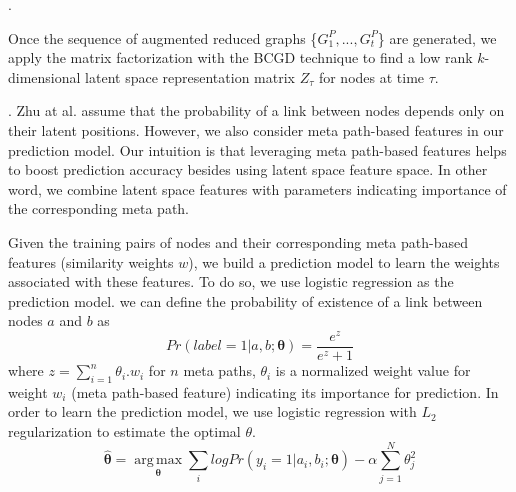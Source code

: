 .

Once the sequence of augmented reduced graphs \{$G^P_1, ..., G^P_t$\} are generated, we apply the matrix factorization with the BCGD technique \cite{Zhu2016} to find a low rank $k$-dimensional latent space representation matrix $Z_\tau$ for nodes at time $\tau$.






. Zhu at al. \cite{Zhu2016} assume that the probability of a link between nodes depends only on their latent positions. However, we also consider meta path-based features in our prediction model. Our intuition is that leveraging meta path-based features helps to boost prediction accuracy besides using latent space feature space. In other word, we combine latent space features with parameters indicating importance of the corresponding meta path.

Given the training pairs of nodes and their corresponding meta path-based features (similarity weights $w$), we build a prediction model to learn the weights associated with these features. To do so, we use logistic regression as the prediction model. we can define the probability of existence of a link between nodes $a$ and $b$ as 
\begin{equation*}
Pr(label = 1|a, b; \boldsymbol{\theta}) = \frac{e^{z}}{e^{z}+1}
\end{equation*}
where $z=\sum\limits_{i=1}^{n}\theta_i.w_i$ for $n$ meta paths, $\theta_i$ is a normalized weight value for weight $w_i$ (meta path-based feature) indicating its importance for prediction. In order to learn the prediction model, we use
logistic regression with $L_2$ regularization to estimate the optimal $\theta$. \begin{equation*}
\boldsymbol{\hat{\theta}} = 
\operatorname*{arg\,max}_{\boldsymbol{\theta}}\sum_i log Pr(y_i = 1|a_i, b_i; \boldsymbol{\theta}) - \alpha \sum_{j=1}^N \theta_j^2
\end{equation*}

